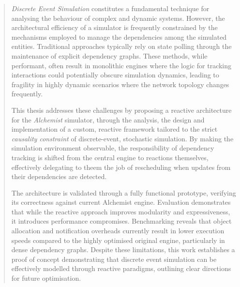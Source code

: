 \begin{abstract}
    \emph{Discrete Event Simulation} constitutes a fundamental technique for
    analysing the behaviour of complex and dynamic systems. However, the
    architectural efficiency of a simulator is frequently constrained by the
    mechanisms employed to manage the dependencies among the simulated
    entities. Traditional approaches typically rely on state polling through
    the maintenance of explicit dependency graphs. These methods, while
    performant, often result in monolithic engines where the logic for tracking
    interactions could potentially obscure simulation dynamics, leading to
    fragility in highly dynamic scenarios where the network topology changes
    frequently.

    This thesis addresses these challenges by proposing a reactive architecture
    for the \emph{Alchemist} simulator, through the analysis, the design and
    implementation of a custom, reactive framework tailored to the strict
    \emph{causality constraint} of discrete-event, stochastic simulation. By
    making the simulation environment observable, the responsibility of
    dependency tracking is shifted from the central engine to reactions
    themselves, effectively delegating to theem the job of rescheduling when
    updates from their dependencies are detected.

    The architecture is validated through a fully functional prototype,
    verifying its correctness against current Alchemist engine. Evaluation
    demonstrates that while the reactive approach improves modularity and
    expressiveness, it introduces performance compromises. Benchmarking reveals
    that object allocation and notification overheads currently result in lower
    execution speeds compared to the highly optimised original engine,
    particularly in dense dependency graphs. Despite these limitations, this
    work establishes a proof of concept demonstrating that discrete event
    simulation can be effectively modelled through reactive paradigms,
    outlining clear directions for future optimisation.
\end{abstract}

